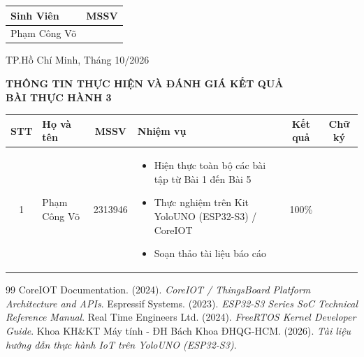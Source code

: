 \documentclass[a4paper]{article}
\begin{document}
\begin{titlepage}
\begin{center}
{\fontsize{13}{14}\selectfont
\begin{tabular}{|>{\centering\arraybackslash}p{7cm}|>{\centering\arraybackslash}p{4cm}|}
\hline
\textbf{Sinh Viên} & \textbf{MSSV} \\
\hline

Phạm Công Võ & 2313946 \\
\hline

\end{tabular}
}
\end{center}


\vspace{1.8cm}
\begin{center}
{\large TP.Hồ Chí Minh, Tháng 10/2026}
\end{center}
\end{titlepage}
\restoregeometry
\restoregeometry

\newpage
\begin{center}
    \textbf{\Large THÔNG TIN THỰC HIỆN VÀ ĐÁNH GIÁ KẾT QUẢ}\\[1ex]
    \textbf{\large BÀI THỰC HÀNH 3}
\end{center}

\vspace{1.5em}

\begin{longtable}{|c|m{4cm}|c|m{4.5cm}|c|c|}
\hline
\textbf{STT} & \textbf{\centering Họ và tên} & \textbf{MSSV} & \textbf{\centering Nhiệm vụ} & \textbf{Kết quả} & \textbf{Chữ ký} \\
\hline
1 & Phạm Công Võ & 2313946 & \begin{itemize}[leftmargin=*]
    \item Hiện thực toàn bộ các bài tập từ Bài 1 đến Bài 5
    \item Thực nghiệm trên Kit YoloUNO (ESP32-S3) / CoreIOT
    \item Soạn thảo tài liệu báo cáo
\end{itemize} & 100\% & \\
\hline
\end{longtable}

\newpage
\tableofcontents
\newpage



\newpage
{}
\begin{thebibliography}{99}
CoreIOT Documentation. (2024). \textit{CoreIOT / ThingsBoard Platform Architecture and APIs}.
Espressif Systems. (2023). \textit{ESP32-S3 Series SoC Technical Reference Manual}.
Real Time Engineers Ltd. (2024). \textit{FreeRTOS Kernel Developer Guide}.
Khoa KH\&KT Máy tính - ĐH Bách Khoa ĐHQG-HCM. (2026). \textit{Tài liệu hướng dẫn thực hành IoT trên YoloUNO (ESP32-S3)}.
\end{thebibliography}
\end{document}
